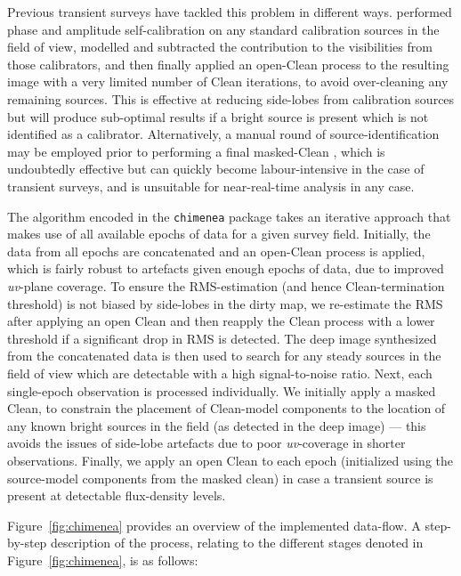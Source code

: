 \documentclass[5p,authoryear]{elsarticle}
\begin{document}
Previous transient surveys have tackled this problem in different ways. \citet{Bell2014} performed phase and amplitude self-calibration on any standard calibration sources in the field of view, modelled and subtracted the contribution to the visibilities from those calibrators, and then finally applied an open-Clean process to the resulting image with a very limited number of Clean iterations, to avoid over-cleaning any remaining sources. 
This is effective at reducing side-lobes from calibration sources but will produce sub-optimal results if a bright source is present which is not identified as a calibrator. 
Alternatively, a manual round of source-identification may be employed prior to performing a final masked-Clean \citep{Miller2008,Mooley2013}, which is undoubtedly effective but can quickly become labour-intensive in the case of transient surveys, and is unsuitable for near-real-time analysis in any case.

The algorithm encoded in the \texttt{chimenea} package takes an iterative approach that makes use of all available epochs of data for a given survey field.
Initially, the data from all epochs are concatenated and an open-Clean process is applied, which is fairly robust to artefacts given enough epochs of data, due to improved \textit{uv}-plane coverage. 
To ensure the RMS-estimation (and hence Clean-termination threshold) is not biased by side-lobes in the dirty map, we re-estimate the RMS after applying an open Clean and then reapply the Clean process with a lower threshold if a significant drop in RMS is detected. 
The deep image synthesized from the concatenated data is then used to search for any steady sources in the field of view which are detectable with a high signal-to-noise ratio.
Next, each single-epoch observation is processed individually. 
We initially apply a masked Clean, to constrain the placement of Clean-model components to the location of any known bright sources in the field (as detected in the deep image) --- this avoids the issues of side-lobe artefacts due to poor \textit{uv}-coverage in shorter observations. 
Finally, we apply an open Clean to each epoch (initialized using the source-model components from the masked clean) in case a transient source is present at detectable flux-density levels.

Figure~\ref{fig:chimenea} provides an overview of the implemented data-flow. 
A step-by-step description of the process, relating to the different stages denoted in Figure~\ref{fig:chimenea}, is as follows:
\end{document}
